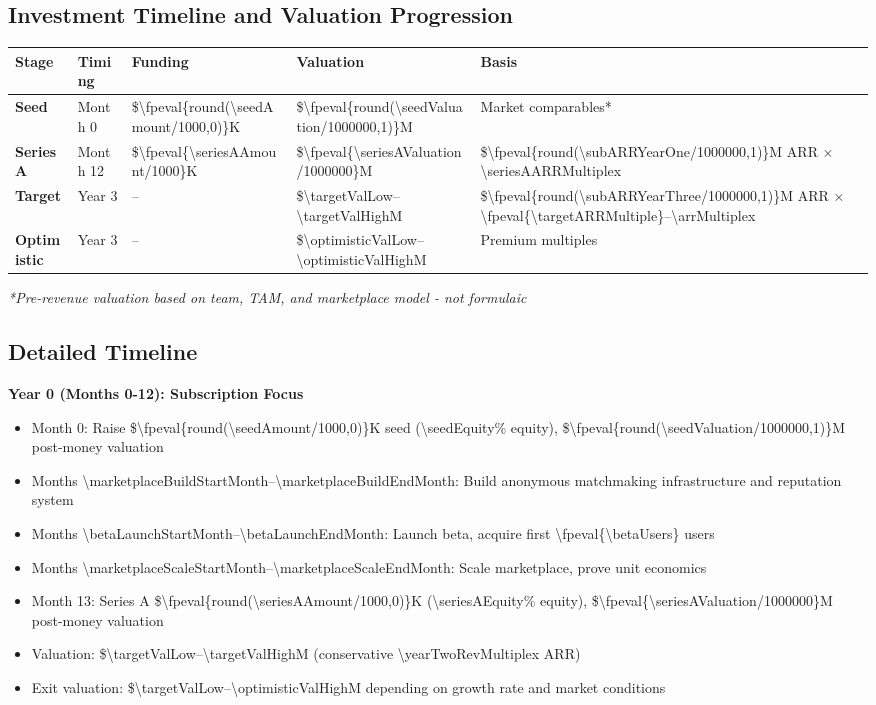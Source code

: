 \documentclass[11pt]{article}
\newcommand{\numfpeval}[1]{\num{\fpeval{#1}}}
\newcommand{\numint}[1]{\num[round-precision=0]{\fpeval{#1}}}
\begin{document}
\subsection{Investment Timeline and Valuation Progression}
\begin{table}[H]
\centering
\begin{tabularx}{\linewidth}{l Y Y Y Y}
\toprule
Stage & Timing & Funding & Valuation & Basis \\\midrule
\textbf{Seed} & Month 0 & \$\numint{round(\seedAmount/1000,0)}K & \$\numfpeval{round(\seedValuation/1000000,1)}M & Market comparables* \\
\textbf{Series A} & Month 12 & \$\numint{\seriesAAmount/1000}K & \$\numfpeval{\seriesAValuation/1000000}M & \$\numfpeval{round(\subARRYearOne/1000000,1)}M ARR × \num{\seriesAARRMultiple}x \\
\textbf{Target} & Year 3 & -- & \$\num{\targetValLow}--\num{\targetValHigh}M & \$\numfpeval{round(\subARRYearThree/1000000,1)}M ARR × \numfpeval{\targetARRMultiple}--\num{\arrMultiple}x \\
\textbf{Optimistic} & Year 3 & -- & \$\num{\optimisticValLow}--\num{\optimisticValHigh}M & Premium multiples \\
\bottomrule
\end{tabularx}
\end{table}
\textit{*Pre-revenue valuation based on team, TAM, and marketplace model - not formulaic}

\subsection{Detailed Timeline}

\textbf{Year 0 (Months 0-12): Subscription Focus}
\begin{itemize}
  \item Month 0: Raise \$\numint{round(\seedAmount/1000,0)}K seed (\num{\seedEquity}\% equity), \$\numfpeval{round(\seedValuation/1000000,1)}M post-money valuation
  \item Months \num{\marketplaceBuildStartMonth}--\num{\marketplaceBuildEndMonth}: Build anonymous matchmaking infrastructure and reputation system
  \item Months \num{\betaLaunchStartMonth}--\num{\betaLaunchEndMonth}: Launch beta, acquire first \numint{\betaUsers} users
  \item Months \num{\marketplaceScaleStartMonth}--\num{\marketplaceScaleEndMonth}: Scale marketplace, prove unit economics
  \item Month 13: Series A \$\numint{round(\seriesAAmount/1000,0)}K (\num{\seriesAEquity}\% equity), \$\numfpeval{\seriesAValuation/1000000}M post-money valuation
  \item Valuation: \$\num{\targetValLow}--\num{\targetValHigh}M (conservative \num{\yearTwoRevMultiple}x ARR)
  \item Exit valuation: \$\num{\targetValLow}--\num{\optimisticValHigh}M depending on growth rate and market conditions
\end{itemize}
\end{document}
